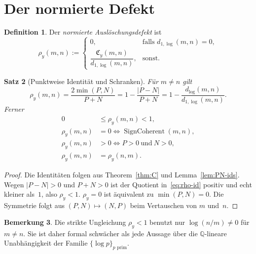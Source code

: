 \documentclass[11pt,a4paper]{article}
\newtheorem{theorem}{Satz}
\theoremstyle{definition}
\newtheorem{definition}[theorem]{Definition}
\newtheorem{remark}[theorem]{Bemerkung}
\newcommand{\Q}{\mathbb{Q}}
\newcommand{\dlog}{d_{\log}}
\newcommand{\dlogone}{d_{1,\log}}
\newcommand{\Cy}{\mathfrak{C}_y}
\newcommand{\rhoy}{\rho_y}
\newcommand{\SignCoh}{\operatorname{SignCoherent}}
\begin{document}
	\section{Der normierte Defekt}
	\label{sec:rho}
	
	\begin{definition}
		\label{def:rho}
		Der \emph{normierte Ausl{\"o}schungsdefekt} ist
		\[
		\rhoy(m,n)
		:=
		\begin{cases}
			0,&\text{falls }\dlogone(m,n)=0,\\[1mm]
			\dfrac{\Cy(m,n)}{\dlogone(m,n)},&\text{sonst.}
		\end{cases}
		\]
	\end{definition}
	
	\begin{theorem}[Punktweise Identit{\"a}t und Schranken]
		\label{thm:rho}
		F{\"u}r $m\neq n$ gilt
		\begin{equation}
			\label{eq:rho-id}
			\rhoy(m,n)
			=
			\frac{2\min(P,N)}{P+N}
			=
			1-\frac{\lvert P-N\rvert}{P+N}
			=
			1-\frac{\dlog(m,n)}{\dlogone(m,n)}.
		\end{equation}
		Ferner
		\begin{align}
			0&\le\rhoy(m,n)<1,
			\\
			\rhoy(m,n)&=0
			\iff
			\SignCoh(m,n),
			\\
			\rhoy(m,n)&>0
			\iff
			P>0\ \text{und}\ N>0,
			\\
			\rhoy(m,n)&=\rhoy(n,m).
		\end{align}
	\end{theorem}
	
	\begin{proof}
		Die Identit{\"a}ten folgen aus Theorem~\ref{thm:C} und
		Lemma~\ref{lem:PN-ids}.
		Wegen $\lvert P-N\rvert>0$ und $P+N>0$ ist der Quotient in~\eqref{eq:rho-id}
		positiv und echt kleiner als~$1$, also $\rhoy<1$.
		$\rhoy=0$ ist {\"a}quivalent zu $\min(P,N)=0$.
		Die Symmetrie folgt aus $(P,N)\mapsto(N,P)$ beim Vertauschen von $m$ und~$n$.
	\end{proof}
	
	\begin{remark}
		Die strikte Ungleichung $\rhoy<1$ benutzt nur $\log(n/m)\neq 0$ f{\"u}r
		$m\neq n$. Sie ist daher formal schw{\"a}cher als jede Aussage {\"u}ber die
		$\Q$-lineare Unabh{\"a}ngigkeit der Familie $\{\log p\}_{p\text{ prim}}$.
	\end{remark}
	
\end{document}
